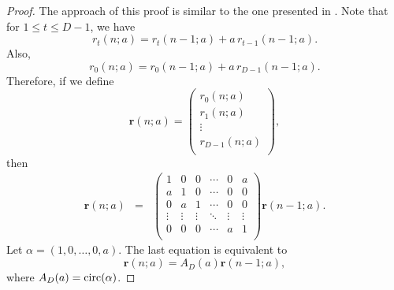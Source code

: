 \begin{proof}
The approach of this proof is similar to the one presented in \cite{cai}.  Note that for $1\leq t \leq D-1$, we have
\begin{equation}
r_t(n;a) = r_t(n-1;a)+a\,r_{t-1}(n-1;a).
\end{equation}
Also,
\begin{equation}
r_0(n;a) = r_0(n-1;a)+a\,r_{D-1}(n-1;a).
\end{equation}
Therefore, if we define
\begin{equation}
 \boldsymbol{r}(n;a)=\left(
\begin{array}{c}
 r_0(n;a) \\
 r_1(n;a) \\
 \vdots \\
 r_{D-1}(n;a) \\
\end{array}
\right),
\end{equation}
then
\begin{eqnarray}
 \boldsymbol{r}(n;a)&=&\left(
\begin{array}{cccccc}
 1 & 0 & 0 & \cdots & 0 & a \\
 a & 1 & 0 & \cdots & 0 & 0 \\
 0 & a & 1 & \cdots & 0 & 0 \\
 \vdots & \vdots & \vdots & \ddots & \vdots & \vdots\\
 0 & 0 & 0 & \cdots & a & 1 \\
\end{array}
\right) \boldsymbol{r}(n-1;a).
\end{eqnarray}
Let $\alpha=(1,0,\ldots, 0, a)$.  The last equation is equivalent to
\begin{equation}
\label{matrec}
 \boldsymbol{r}(n;a)= A_D(a)\boldsymbol{r}(n-1;a),
\end{equation}
where $A_D(a)=\operatorname{circ}(\alpha)$.


\end{proof}

